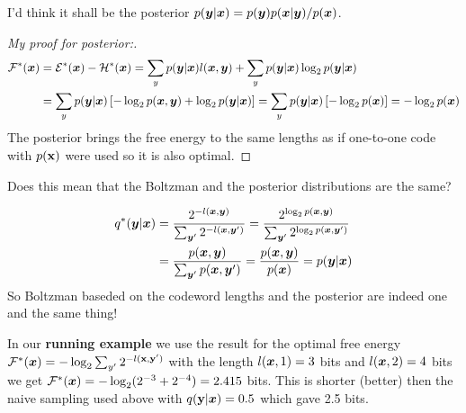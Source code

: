 \begin{notebox}[colback=yellow!5]
I'd think it shall be the posterior $p({\bm{y}} \vert {\bm{x}}) = p({\bm{y}})p({\bm{x}} | {\bm{y}}) / p({\bm{x}})$.

\begin{proof}[My proof for posterior:]
\begin{align*}
\mathcal{F^*}({\bm{x}}) & = \mathcal{E^*}({\bm{x}}) - \mathcal{H^*}({\bm{x}})
= \sum_y p({\bm{y}} | {\bm{x}}) l({\bm{x}}, {\bm{y}}) + \sum_y p({\bm{y}} | {\bm{x}}) \log_2 p({\bm{y}} | {\bm{x}}) \\
& = \sum_y p({\bm{y}} | {\bm{x}}) \left[- \log_2 p({\bm{x}}, {\bm{y}}) + \log_2 p({\bm{y}} | {\bm{x}})\right]
= \sum_y p({\bm{y}} | {\bm{x}}) \left[- \log_2 p({\bm{x}}) \right] = - \log_2 p({\bm{x}})
\end{align*}
The posterior brings the free energy to the same lengths as if one-to-one code with $p({\mathbf{x}})$ were used so it is also optimal.
\end{proof}

Does this mean that the Boltzman and the posterior distributions are the same?

\begin{align*}
q^*({\bm{y}} | {\bm{x}}) & = \frac{2^{-l({\bm{x}}, {\bm{y}})}}{\sum_{{\bm{y}}'} 2^{-l({\bm{x}}, {\bm{y}}')}}
= \frac{2^{\log_2 p({\bm{x}}, {\bm{y}})}}{\sum_{{\bm{y}}'} 2^{\log_2 p({\bm{x}}, {\bm{y}}')}} \nonumber \\
& = \frac{p({\bm{x}}, {\bm{y}})}{\sum_{{\bm{y}}'} p({\bm{x}}, {\bm{y}}')} = \frac{p({\bm{x}}, {\bm{y}})}{p({\bm{x}})} = p({\bm{y}} | {\bm{x}})
\end{align*}
So Boltzman baseded on the codeword lengths and the posterior are indeed one and the same thing!
\end{notebox}


In our \textbf{running example} we use the result for the optimal free energy
$\mathcal{F^*}({\bm{x}}) = - \log_2 \sum_{y'} 2^{-l({\mathbf{x}}, {\mathbf{y}}')}$ with the length
$l({\bm{x}}, 1) = 3$ bits and $l({\bm{x}}, 2) = 4$ bits we get
$\mathcal{F^*}({\bm{x}}) = - \log_2 (2^{-3} + 2^{-4}) = 2.415$ bits.
This is shorter (better) then the naive sampling used above with $q({\mathbf{y}} | {\bm{x}}) = 0.5$ which gave 2.5 bits.

